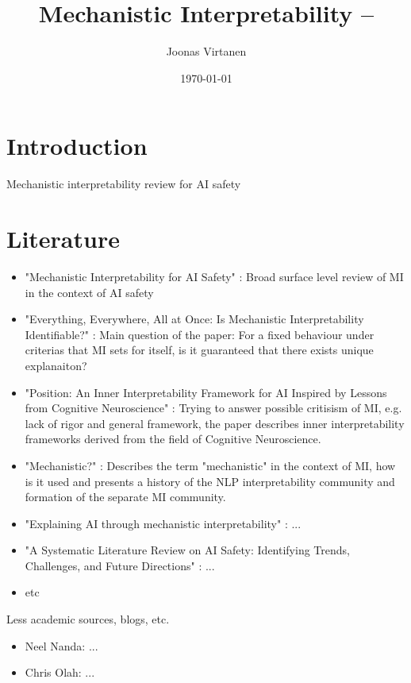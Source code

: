 \documentclass[12pt, a4paper]{article}
\title{Mechanistic Interpretability -- }
\author{Joonas Virtanen}
\date{\today}
\begin{document}
\maketitle

\section{Introduction}
Mechanistic interpretability review for AI safety \cite{bereska2024}

\section*{Literature}
\begin{itemize}
    \item "Mechanistic Interpretability for AI Safety" \cite{bereska2024}: Broad surface level review of MI in the context of AI safety
    \item "Everything, Everywhere, All at Once: Is Mechanistic Interpretability Identifiable?" \cite{meloux2025}: Main question of the paper: For a fixed behaviour under criterias that MI sets for itself, is it guaranteed that there exists unique explanaiton?
    \item "Position: An Inner Interpretability Framework for AI Inspired by Lessons from Cognitive Neuroscience" \cite{vilas2024}: Trying to answer possible critisism of MI, e.g. lack of rigor and general framework, the paper describes inner interpretability frameworks derived from the field of Cognitive Neuroscience.
    \item "Mechanistic?" \cite{wiegreffe2024}: Describes the term "mechanistic" in the context of MI, how is it used and presents a history of the NLP interpretability community and formation of the separate MI community.
    \item "Explaining AI through mechanistic interpretability" \cite{kästner2024}: ...
    \item "A Systematic Literature Review on AI Safety: Identifying Trends, Challenges, and Future Directions" \cite{salhab2024}: ...
    \item etc
\end{itemize}

Less academic sources, blogs, etc.
\begin{itemize}
    \item Neel Nanda: ...
    \item Chris Olah: ...
\end{itemize}


\printbibliography
\end{document}
